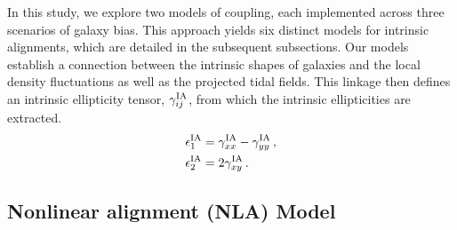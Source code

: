 In this study, we explore two models of coupling, each implemented across three scenarios of galaxy bias.
This approach yields six distinct models for intrinsic alignments, which are detailed in the subsequent subsections. 
Our models establish a connection between the intrinsic shapes of galaxies and the local density fluctuations as well as the projected tidal fields. 
This linkage then defines an intrinsic ellipticity tensor, $\gamma_{ij}^{\rm IA}$, from which the intrinsic ellipticities are extracted.
\begin{equation}
\begin{split}
\epsilon_{1}^{\rm IA} &= \gamma_{xx}^{\rm IA} - \gamma_{yy}^{\rm IA} \, , 
\\
\epsilon_{2}^{\rm IA} &= 2 \gamma_{xy}^{\rm IA} \, .
\label{eq:tidal_th_deltaNLA}
\end{split}
\end{equation}

 
\subsection{Nonlinear alignment (NLA) Model}


